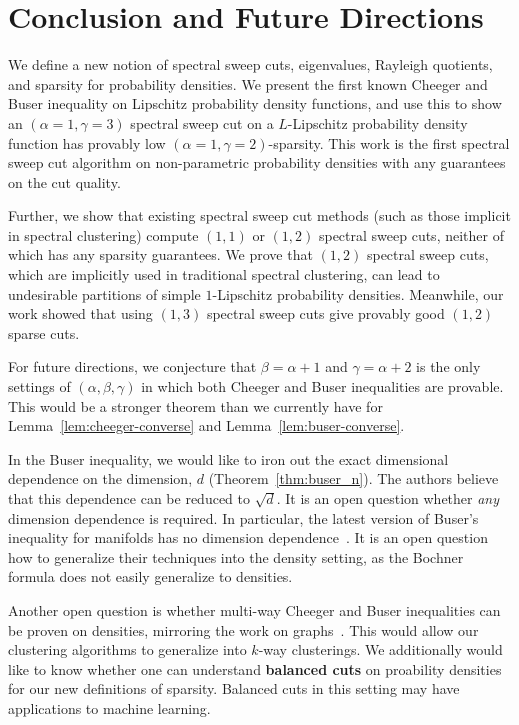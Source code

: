 \section{Conclusion and Future Directions}\label{sec:conclusion}
We define a new notion of spectral sweep cuts, eigenvalues,
Rayleigh quotients, and sparsity for probability densities. We
present the first known Cheeger and Buser inequality on Lipschitz
probability density functions, and use this to show an
$(\alpha=1, \gamma=3)$ spectral
sweep cut on a $L$-Lipschitz probability density function has
provably low $(\alpha=1,\gamma=2)$-sparsity. This work is the first spectral sweep
cut algorithm on non-parametric probability densities with any guarantees on the cut quality.

Further, we show that existing spectral sweep cut methods (such
as those implicit in spectral clustering) compute
$(1, 1)$ or $(1,2)$ spectral sweep cuts, neither of which
has any sparsity guarantees. We prove that $(1,2)$ spectral sweep
cuts, which are implicitly used in traditional spectral
clustering, can lead to undesirable partitions of simple 
$1$-Lipschitz probability densities. Meanwhile, our work showed
that using $(1,3)$ spectral sweep cuts give provably good $(1,2)$
sparse cuts.

For future directions, we conjecture that $\beta =
\alpha+1$ and $\gamma = \alpha+2$ is the only settings of
$(\alpha, \beta, \gamma)$ in which both Cheeger and Buser
inequalities are provable. This would be a stronger theorem than
we currently have for Lemma~\ref{lem:cheeger-converse} and
Lemma~\ref{lem:buser-converse}.

In the Buser inequality, we would like to iron out the exact dimensional
dependence on the dimension,
$d$ (Theorem~\ref{thm:buser_n}). The
authors believe that this dependence can be
reduced to $\sqrt{d}$. It is an open question whether
\textit{any}
dimension dependence is required.  In particular, the latest
version of
Buser's inequality for manifolds has no dimension
dependence~\cite{ledoux2004spectral}. It is an open question how to
generalize their techniques into the density setting, as the
Bochner formula does not easily generalize to densities.

Another open question is whether multi-way Cheeger and Buser inequalities
can be proven on densities, mirroring the work on
graphs~\cite{Louis12, kw16, LeeMultiway14, Lee2014}. This would
allow our clustering algorithms to generalize into $k$-way
clusterings. We additionally would like to know whether one can
understand \textbf{balanced cuts} on proability densities for our
new definitions of sparsity. Balanced cuts in this setting may
have applications to machine learning.

